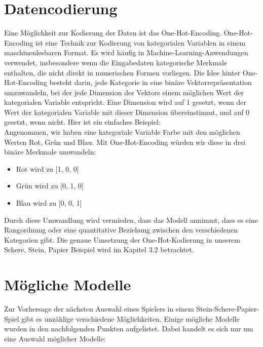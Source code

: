 \documentclass[thesis=paper,fancy]{hsmw-thesis}
\begin{document}
\section{Datencodierung}
Eine Möglichkeit zur Kodierung der Daten ist das One-Hot-Encoding. 
One-Hot-Encoding ist eine Technik zur Kodierung von kategorialen Variablen in einem maschinenlesbaren Format. Es wird häufig in Machine-Learning-Anwendungen verwendet, insbesondere wenn die Eingabedaten kategorische Merkmale enthalten, die nicht direkt in numerischen Formen vorliegen. Die Idee hinter One-Hot-Encoding besteht darin, jede Kategorie in eine binäre Vektorrepräsentation umzuwandeln, bei der jede Dimension des Vektors einem möglichen Wert der kategorialen Variable entspricht. Eine Dimension wird auf 1 gesetzt, wenn der Wert der kategorialen Variable mit dieser Dimension übereinstimmt, und auf 0 gesetzt, wenn nicht.
Hier ist ein einfaches Beispiel: \\
Angenommen, wir haben eine kategoriale Variable Farbe mit den möglichen Werten Rot, Grün und Blau. Mit One-Hot-Encoding würden wir diese in drei binäre Merkmale umwandeln:

\begin{itemize}
\item Rot wird zu [1, 0, 0]
\item Grün wird zu [0, 1, 0]
\item Blau wird zu [0, 0, 1]
\end{itemize}
Durch diese Umwandlung wird vermieden, dass das Modell annimmt, dass es eine Rangordnung oder eine quantitative Beziehung zwischen den verschiedenen Kategorien gibt. Die genaue Umsetzung der One-Hot-Kodierung in unserem Schere, Stein, Papier Beispiel wird im Kapitel 3.2 betrachtet.


\section{Mögliche Modelle}
Zur Vorhersage der nächsten Auswahl eines Spielers in einem Stein-Schere-Papier-Spiel gibt es unzählige verschiedene Möglichkeiten. Einige mögliche Modelle wurden in den nachfolgenden Punkten aufgelistet. Dabei handelt es sich nur um eine Auswahl möglicher Modelle:
\end{document}
